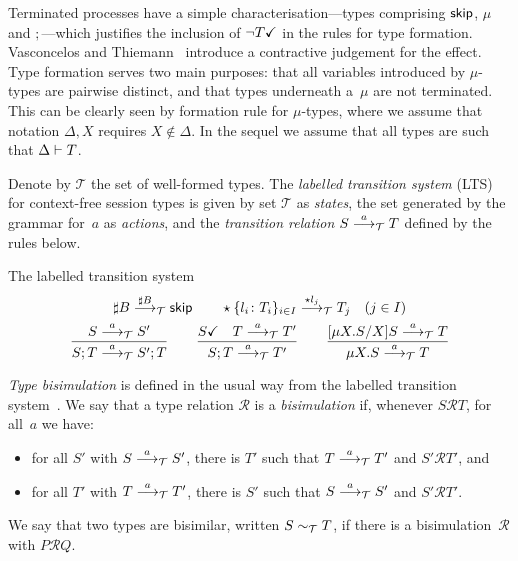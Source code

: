 Terminated processes have a simple characterisation---types comprising
$\skipk$, $\mu$ and $;$---which justifies the inclusion of
$\neg\DONE T$ in the rules for type formation. Vasconcelos and
Thiemann~\cite{thiemann2016context} introduce a contractive judgement
for the effect.
%
Type formation serves two main purposes: that all variables introduced
by $\mu$-types are pairwise distinct, and that types underneath
a~$\mu$ are not terminated. This can be clearly seen by formation rule
for $\mu$-types, where we assume that notation $\Delta,X$ requires
$X\notin\Delta$.
%
In the sequel we assume that all types are such that $\isType T$.

Denote by $\mathcal{T}$ the set of well-formed types.
%
The \emph{labelled transition system} (LTS) for context-free session
types is given by set $\mathcal{T}$ as \emph{states}, the set
generated by the grammar for~$a$ as \emph{actions}, and the
\emph{transition relation} $S\LTSderives T$ defined by the rules below.

\noindent The labelled transition system\hfill{}
%
\begin{gather*}
  \sharp B \LTSderives[\sharp B] \skipk
  \qquad
  \star\{l_i\colon T_i\}_{i\in I} \LTSderives[\star l_j] T_j\quad
  (j\in I)
  \\
  \frac{S \LTSderives S'}{S; T \LTSderives S';T}
  \qquad
  \frac{\DONE{S} \quad T \LTSderives T'}{S; T \LTSderives T'}
  \qquad
  \frac{\subs{\mu X.S}{X}S \LTSderives T}{\mu X.S \LTSderives T}
\end{gather*}

\emph{Type bisimulation} is defined in the usual way from the labelled
transition system~\cite{sangiorgi2014introduction}.
%
We say that a type relation $\mathcal R$ is a \emph{bisimulation} if,
whenever $S\mathcal RT$, for all~$a$ we have:
%
\begin{itemize}
\item for all $S'$ with $S \LTSderives S'$, there is $T'$ such that $T
  \LTSderives T'$ and $S'\mathcal RT'$, and
\item for all $T'$ with $T \LTSderives T'$, there is $S'$ such that $S
  \LTSderives S'$ and $S'\mathcal RT'$.
\end{itemize}
%
We say that two types are bisimilar, written $S \bisim T$, if there
is a bisimulation~$\mathcal R$ with $P\mathcal RQ$.

